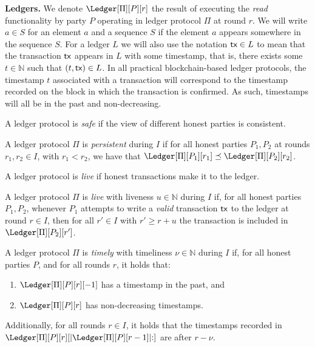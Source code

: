 \noindent
\textbf{Ledgers.}
We denote $\Ledger[\Pi][P][r]$ the result of executing the \emph{read} functionality by party $P$
operating in ledger protocol $\Pi$ at round $r$. %
We will write
$a \in S$ for an element $a$ and a sequence $S$ if the element $a$ appears somewhere in
the sequence $S$. For a ledger $L$ we will also use the notation $\textsf{tx} \in L$ to mean that
the transaction $\textsf{tx}$ appears in $L$ with some timestamp, that is, there exists some $t \in \mathbb{N}$
such that $(t, \textsf{tx}) \in L$. In all practical blockchain-based ledger protocols, the timestamp $t$
associated with a transaction will correspond to the timestamp recorded on the block in which the
transaction is confirmed. As such, timestamps will all be in the past and non-decreasing.

A ledger protocol is \emph{safe} if the view of different honest parties is consistent.

\begin{definition}[Persistence]
  A ledger protocol $\Pi$ is \emph{persistent} during $I$ if for all honest parties $P_1, P_2$ at rounds
  $r_1, r_2 \in I$, with $r_1 < r_2$,
  we have that $\Ledger[\Pi][P_1][r_1] \preceq \Ledger[\Pi][P_2][r_2]$.
\end{definition}

A ledger protocol is \emph{live} if honest transactions make it to the ledger.

\begin{definition}[Liveness]
  A ledger protocol $\Pi$ is \emph{live} with liveness $u \in \mathbb{N}$ during $I$ if,
  for all honest parties $P_1, P_2$, whenever
  $P_1$ attempts to write a \emph{valid} transaction $\textsf{tx}$ to the ledger at round $r \in I$,
  then for all $r' \in I$ with $r' \geq r + u$
  the transaction is included in $\Ledger[\Pi][P_2][r']$.
\end{definition}

\begin{definition}[Timeliness]
  A ledger protocol $\Pi$ is \emph{timely} with timeliness $\nu \in \mathbb{N}$ during $I$ if,
  for all honest parties $P$, and for all rounds $r$, it holds that:

  \begin{enumerate}
    \item $\Ledger[\Pi][P][r][-1]$ has a timestamp in the past, and
    \item $\Ledger[\Pi][P][r]$ has non-decreasing timestamps.
  \end{enumerate}

  Additionally, for all rounds $r \in I$, it holds that
  the timestamps recorded in $\Ledger[\Pi][P][r][|\Ledger[\Pi][P][r-1]|{:}]$
  are after $r - \nu$.
\end{definition}

